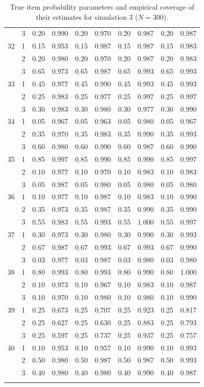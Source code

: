 \begin{longtable}{llcccccccc}
   & 3 & 0.20 & 0.990 & 0.20 & 0.970 & 0.20 & 0.987 & 0.20 & 0.987 \\ 
  32 & 1 & 0.15 & 0.953 & 0.15 & 0.987 & 0.15 & 0.987 & 0.15 & 0.983 \\ 
   & 2 & 0.20 & 0.980 & 0.20 & 0.970 & 0.20 & 0.987 & 0.20 & 0.983 \\ 
   & 3 & 0.65 & 0.973 & 0.65 & 0.987 & 0.65 & 0.993 & 0.65 & 0.993 \\ 
  33 & 1 & 0.45 & 0.977 & 0.45 & 0.990 & 0.45 & 0.993 & 0.45 & 0.993 \\ 
   & 2 & 0.25 & 0.983 & 0.25 & 0.977 & 0.25 & 0.997 & 0.25 & 0.997 \\ 
   & 3 & 0.30 & 0.983 & 0.30 & 0.980 & 0.30 & 0.977 & 0.30 & 0.990 \\ 
  34 & 1 & 0.05 & 0.967 & 0.05 & 0.963 & 0.05 & 0.980 & 0.05 & 0.967 \\ 
   & 2 & 0.35 & 0.970 & 0.35 & 0.983 & 0.35 & 0.990 & 0.35 & 0.993 \\ 
   & 3 & 0.60 & 0.980 & 0.60 & 0.990 & 0.60 & 0.987 & 0.60 & 0.990 \\ 
  35 & 1 & 0.85 & 0.997 & 0.85 & 0.990 & 0.85 & 0.990 & 0.85 & 0.997 \\ 
   & 2 & 0.10 & 0.977 & 0.10 & 0.970 & 0.10 & 0.983 & 0.10 & 0.983 \\ 
   & 3 & 0.05 & 0.987 & 0.05 & 0.980 & 0.05 & 0.980 & 0.05 & 0.980 \\ 
  36 & 1 & 0.10 & 0.977 & 0.10 & 0.987 & 0.10 & 0.983 & 0.10 & 0.990 \\ 
   & 2 & 0.35 & 0.973 & 0.35 & 0.987 & 0.35 & 0.990 & 0.35 & 0.990 \\ 
   & 3 & 0.55 & 0.983 & 0.55 & 0.993 & 0.55 & 1.000 & 0.55 & 0.997 \\ 
  37 & 1 & 0.30 & 0.973 & 0.30 & 0.980 & 0.30 & 0.990 & 0.30 & 0.993 \\ 
   & 2 & 0.67 & 0.987 & 0.67 & 0.993 & 0.67 & 0.993 & 0.67 & 0.990 \\ 
   & 3 & 0.03 & 0.977 & 0.03 & 0.987 & 0.03 & 0.980 & 0.03 & 0.980 \\ 
  38 & 1 & 0.80 & 0.993 & 0.80 & 0.993 & 0.80 & 0.990 & 0.80 & 1.000 \\ 
   & 2 & 0.10 & 0.973 & 0.10 & 0.967 & 0.10 & 0.983 & 0.10 & 0.987 \\ 
   & 3 & 0.10 & 0.970 & 0.10 & 0.980 & 0.10 & 0.980 & 0.10 & 0.990 \\ 
  39 & 1 & 0.25 & 0.673 & 0.25 & 0.707 & 0.25 & 0.923 & 0.25 & 0.817 \\ 
   & 2 & 0.25 & 0.627 & 0.25 & 0.630 & 0.25 & 0.883 & 0.25 & 0.793 \\ 
   & 3 & 0.25 & 0.597 & 0.25 & 0.737 & 0.25 & 0.937 & 0.25 & 0.757 \\ 
  40 & 1 & 0.10 & 0.953 & 0.10 & 0.957 & 0.10 & 0.990 & 0.10 & 0.993 \\ 
   & 2 & 0.50 & 0.980 & 0.50 & 0.987 & 0.50 & 0.987 & 0.50 & 0.993 \\ 
   & 3 & 0.40 & 0.980 & 0.40 & 0.980 & 0.40 & 0.990 & 0.40 & 0.987 \\ 
   \bottomrule
\caption{True item probability parameters and empirical coverage of their estimates for simulation 3 ($N = 300$).} 
\label{table:sim3_item_prob_coverage_N300}
\end{longtable}
